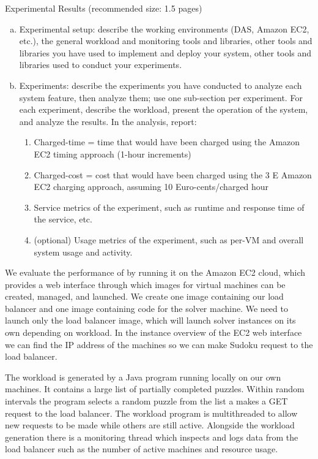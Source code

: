 Experimental Results (recommended size: 1.5 pages)

\begin{enumerate}[(a)]
	\item Experimental setup: describe the working environments (DAS, Amazon EC2,
	etc.), the general workload and monitoring tools and libraries, other tools and libraries you have used to implement and deploy your system, other tools and libraries used to conduct your experiments.
	\item Experiments: describe the experiments you have conducted to analyze each system feature, then analyze them; use one sub-section per experiment. For each experiment, describe the workload, present the operation of the system, and analyze the results. In the analysis, report:
	\begin{enumerate}
		\item Charged-time = time that would have been charged using the Amazon EC2 timing approach (1-hour increments)
		\item Charged-cost = cost that would have been charged using the 3
		E
		Amazon EC2 charging approach, assuming 10 Euro-cents/charged hour
		\item Service metrics of the experiment, such as runtime and response time of
		the service, etc.
		\item (optional) Usage metrics of the experiment, such as per-VM and overall
		system usage and activity.
	\end{enumerate}
\end{enumerate}

We evaluate the performance of \appName{} by running it on the Amazon EC2 cloud, which provides a web interface through which images for virtual machines can be created, managed, and launched.
We create one image containing our load balancer and one image containing code for the solver machine.
We need to launch only the load balancer image, which will launch solver instances on its own depending on workload.
In the instance overview of the EC2 web interface we can find the IP address of the machines so we can make Sudoku request to the load balancer. 

The workload is generated by a Java program running locally on our own machines.
It contains a large list of partially completed puzzles. Within random intervals the program selects a random puzzle from the list a makes a GET request to the load balancer.   
The workload program is multithreaded to allow new requests to be made while others are still active.
Alongside the workload generation there is a monitoring thread which inspects and logs data from the load balancer such as the number of active machines and resource usage.

